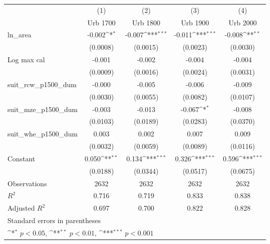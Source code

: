 {
\def\sym#1{\ifmmode^{#1}\else\(^{#1}\)\fi}
\begin{tabular}{l*{4}{c}}
\toprule
                    &\multicolumn{1}{c}{(1)}&\multicolumn{1}{c}{(2)}&\multicolumn{1}{c}{(3)}&\multicolumn{1}{c}{(4)}\\
                    &\multicolumn{1}{c}{Urb 1700}&\multicolumn{1}{c}{Urb 1800}&\multicolumn{1}{c}{Urb 1900}&\multicolumn{1}{c}{Urb 2000}\\
\midrule
ln\_area             &      -0.002\sym{*}  &      -0.007\sym{***}&      -0.011\sym{***}&      -0.008\sym{**} \\
                    &    (0.0008)         &    (0.0015)         &    (0.0023)         &    (0.0030)         \\
\addlinespace
Log max cal         &      -0.001         &      -0.002         &      -0.004         &      -0.004         \\
                    &    (0.0009)         &    (0.0016)         &    (0.0024)         &    (0.0031)         \\
\addlinespace
suit\_rcw\_p1500\_dum  &      -0.000         &      -0.005         &      -0.006         &      -0.009         \\
                    &    (0.0030)         &    (0.0055)         &    (0.0082)         &    (0.0107)         \\
\addlinespace
suit\_mze\_p1500\_dum  &      -0.003         &      -0.013         &      -0.067\sym{*}  &      -0.008         \\
                    &    (0.0103)         &    (0.0189)         &    (0.0283)         &    (0.0370)         \\
\addlinespace
suit\_whe\_p1500\_dum  &       0.003         &       0.002         &       0.007         &       0.009         \\
                    &    (0.0032)         &    (0.0059)         &    (0.0089)         &    (0.0116)         \\
\addlinespace
Constant            &       0.050\sym{**} &       0.134\sym{***}&       0.326\sym{***}&       0.596\sym{***}\\
                    &    (0.0188)         &    (0.0344)         &    (0.0517)         &    (0.0675)         \\
\midrule
Observations        &        2632         &        2632         &        2632         &        2632         \\
\(R^{2}\)           &       0.716         &       0.719         &       0.833         &       0.838         \\
Adjusted \(R^{2}\)  &       0.697         &       0.700         &       0.822         &       0.828         \\
\bottomrule
\multicolumn{5}{l}{\footnotesize Standard errors in parentheses}\\
\multicolumn{5}{l}{\footnotesize \sym{*} \(p<0.05\), \sym{**} \(p<0.01\), \sym{***} \(p<0.001\)}\\
\end{tabular}
}
